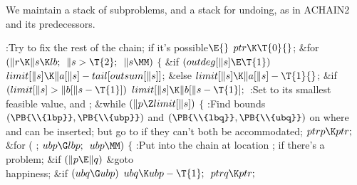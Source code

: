 We maintain a stack of subproblems, and a stack for undoing,
as in {\mc ACHAIN2} and its predecessors.

\Y\B\4:Try to fix the rest of the chain;  if
it's possible\X${}\E{}$\6
$\\{ptr}\K\T{0}{}$;\6
\&{for} ${}(\|r\K\|s\K\\{lb};{}$ ${}\|s>\T{2};{}$ ${}\|s\MM){}$\5
${}\{{}$\1\6
\&{if} ${}(\\{outdeg}[\|s]\E\T{1}){}$\1\5
${}\\{limit}[\|s]\K\|a[\|s]-\\{tail}[\\{outsum}[\|s]]{}$;\5
\2\&{else}\1\5
${}\\{limit}[\|s]\K\|a[\|s]-\T{1}{}$;\2\6
\&{if} ${}(\\{limit}[\|s]>\|b[\|s-\T{1}]){}$\1\5
${}\\{limit}[\|s]\K\|b[\|s-\T{1}];{}$\2\6
:Set  to its smallest feasible value, and %
\X;\6
\&{while} ${}(\|p\Z\\{limit}[\|s]){}$\5
${}\{{}$\1\6
:Find bounds $(\PB{\\{lbp}},\PB{\\{ubp}})$ and $(\PB{\\{lbq}},\PB{%
\\{ubq}})$ on where  and  can be inserted; but go to  if they can't both be accommodated\X;\6
${}\\{ptrp}\K\\{ptr};{}$\6
\&{for} ( ; ${}\\{ubp}\G\\{lbp};{}$ ${}\\{ubp}\MM){}$\5
${}\{{}$\1\6
:Put  into the chain at location ;  if there's a problem\X;\6
\&{if} ${}(\|p\E\|q){}$\1\5
\&{goto} \\{happiness};\2\6
\&{if} ${}(\\{ubq}\G\\{ubp}){}$\1\5
${}\\{ubq}\K\\{ubp}-\T{1};{}$\2\6
${}\\{ptrq}\K\\{ptr};{}$\6
